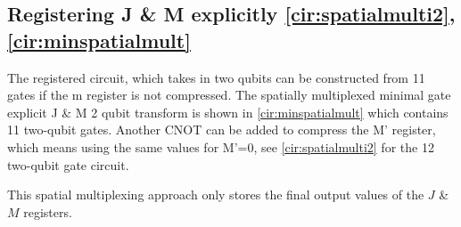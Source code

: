 \subsection{Registering J \& M explicitly \autoref{cir:spatialmulti2}, \autoref{cir:minspatialmult}}

The registered circuit, which takes in two qubits can be constructed from 11 gates if the m register is not compressed. The spatially multiplexed minimal gate explicit J \& M 2 qubit transform is shown in \autoref{cir:minspatialmult} which contains 11 two-qubit gates. Another CNOT can be added to compress the M' register, which means using the same values for M'=0, see \autoref{cir:spatialmulti2} for the 12 two-qubit gate circuit.

This spatial multiplexing approach only stores the final output values of the $J$ \& $M$ registers. 
